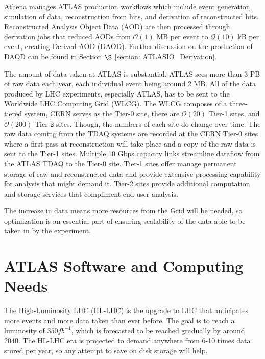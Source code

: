 Athena manages ATLAS production workflows which include event generation, simulation of data, reconstruction from hits, and derivation of reconstructed hits.\cite{athenadocs}
Reconstructed Analysis Object Data (AOD) are then processed through derivation jobs that reduced AODs from  $\mathcal{O}(1)$ MB per event to $\mathcal{O}(10)$ kB per event, creating Derived AOD (DAOD). 
Further discussion on the production of DAOD can be found in Section $\S$ \ref{section: ATLASIO_Derivation}.


The amount of data taken at ATLAS is substantial.
ATLAS sees more than 3 PB of raw data each year, each individual event being around 2 MB.\cite{ATLAS_Fact_Sheet} 
All of the data produced by LHC experiments, especially ATLAS, has to be sent to the Worldwide LHC Computing Grid (WLCG).\cite{WLCG_Tech_design_report}
The WLCG composes of a three-tiered system, CERN serves as the Tier-0 site, there are $\mathcal{O}(20)$ Tier-1 sites, and $\mathcal{O}(200)$ Tier-2 sites.\cite{Martelli_2015}
Though, the numbers of each site do change over time.
The raw data coming from the TDAQ systems are recorded at the CERN Tier-0 sites where a first-pass at reconstruction will take place and a copy of the raw data is sent to the Tier-1 sites.
Multiple 10 Gbps capacity links streamline dataflow from the ATLAS TDAQ to the Tier-0 site. 
Tier-1 sites offer manage permanent storage of raw and reconstructed data and provide extensive processing capability for analysis that might demand it.
Tier-2 sites provide additional computation and storage services that compliment end-user analysis.

The increase in data means more resources from the Grid will be needed, so optimization is an essential part of ensuring scalability of the data able to be taken in by the experiment.

\section{ATLAS Software and Computing Needs}
The High-Luminosity LHC (HL-LHC) is the upgrade to LHC that anticipates more events and more data taken than ever before.
The goal is to reach a luminosity of $350 fb^{-1}$, which is forecasted to be reached gradually by around 2040.\cite{HL-LHC_Tech_design}
The HL-LHC era is projected to demand anywhere from 6-10 times data stored per year, so any attempt to save on disk storage will help.\cite{ATLAS_HL-LHC_projections}

